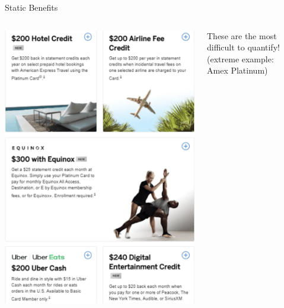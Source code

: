 \begin{frame}{Static Benefits}
\begin{columns}[c]
    \begin{column}{0.6\textwidth}
        \includegraphics[height=0.9\textheight]{../Misc/AmexPlatinum.png}
    \end{column}
    \begin{column}{0.4\textwidth}
        \centering
        These are the most difficult to quantify! 
        (extreme example:\\ Amex Platinum)
    \end{column}
\end{columns}
\end{frame}

